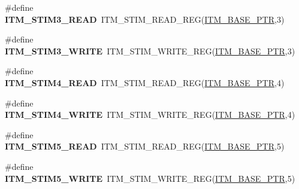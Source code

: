 \begin{DoxyCompactItemize}
\item 
\hypertarget{group___i_t_m___register___accessor___macros_gac2585aa635223db51bc5dfb64d5901f0}{}\#define {\bfseries I\+T\+M\+\_\+\+S\+T\+I\+M3\+\_\+\+R\+E\+A\+D}~I\+T\+M\+\_\+\+S\+T\+I\+M\+\_\+\+R\+E\+A\+D\+\_\+\+R\+E\+G(\hyperlink{group___i_t_m___peripheral_gafaddee8fe8b6a898d4e5edc43ee0d703}{I\+T\+M\+\_\+\+B\+A\+S\+E\+\_\+\+P\+T\+R},3)\label{group___i_t_m___register___accessor___macros_gac2585aa635223db51bc5dfb64d5901f0}

\item 
\hypertarget{group___i_t_m___register___accessor___macros_ga5dd9fe046bf774394e98b8aae32f09be}{}\#define {\bfseries I\+T\+M\+\_\+\+S\+T\+I\+M3\+\_\+\+W\+R\+I\+T\+E}~I\+T\+M\+\_\+\+S\+T\+I\+M\+\_\+\+W\+R\+I\+T\+E\+\_\+\+R\+E\+G(\hyperlink{group___i_t_m___peripheral_gafaddee8fe8b6a898d4e5edc43ee0d703}{I\+T\+M\+\_\+\+B\+A\+S\+E\+\_\+\+P\+T\+R},3)\label{group___i_t_m___register___accessor___macros_ga5dd9fe046bf774394e98b8aae32f09be}

\item 
\hypertarget{group___i_t_m___register___accessor___macros_ga7bc9ebee3625b9f578807478ac2a35fc}{}\#define {\bfseries I\+T\+M\+\_\+\+S\+T\+I\+M4\+\_\+\+R\+E\+A\+D}~I\+T\+M\+\_\+\+S\+T\+I\+M\+\_\+\+R\+E\+A\+D\+\_\+\+R\+E\+G(\hyperlink{group___i_t_m___peripheral_gafaddee8fe8b6a898d4e5edc43ee0d703}{I\+T\+M\+\_\+\+B\+A\+S\+E\+\_\+\+P\+T\+R},4)\label{group___i_t_m___register___accessor___macros_ga7bc9ebee3625b9f578807478ac2a35fc}

\item 
\hypertarget{group___i_t_m___register___accessor___macros_ga15f21956568cb77bc35327f9f4742b0f}{}\#define {\bfseries I\+T\+M\+\_\+\+S\+T\+I\+M4\+\_\+\+W\+R\+I\+T\+E}~I\+T\+M\+\_\+\+S\+T\+I\+M\+\_\+\+W\+R\+I\+T\+E\+\_\+\+R\+E\+G(\hyperlink{group___i_t_m___peripheral_gafaddee8fe8b6a898d4e5edc43ee0d703}{I\+T\+M\+\_\+\+B\+A\+S\+E\+\_\+\+P\+T\+R},4)\label{group___i_t_m___register___accessor___macros_ga15f21956568cb77bc35327f9f4742b0f}

\item 
\hypertarget{group___i_t_m___register___accessor___macros_ga71729386b6675413e54bbae85ca5f6b4}{}\#define {\bfseries I\+T\+M\+\_\+\+S\+T\+I\+M5\+\_\+\+R\+E\+A\+D}~I\+T\+M\+\_\+\+S\+T\+I\+M\+\_\+\+R\+E\+A\+D\+\_\+\+R\+E\+G(\hyperlink{group___i_t_m___peripheral_gafaddee8fe8b6a898d4e5edc43ee0d703}{I\+T\+M\+\_\+\+B\+A\+S\+E\+\_\+\+P\+T\+R},5)\label{group___i_t_m___register___accessor___macros_ga71729386b6675413e54bbae85ca5f6b4}

\item 
\hypertarget{group___i_t_m___register___accessor___macros_ga07b231bcf27e2a69fe3168aa387fc4b7}{}\#define {\bfseries I\+T\+M\+\_\+\+S\+T\+I\+M5\+\_\+\+W\+R\+I\+T\+E}~I\+T\+M\+\_\+\+S\+T\+I\+M\+\_\+\+W\+R\+I\+T\+E\+\_\+\+R\+E\+G(\hyperlink{group___i_t_m___peripheral_gafaddee8fe8b6a898d4e5edc43ee0d703}{I\+T\+M\+\_\+\+B\+A\+S\+E\+\_\+\+P\+T\+R},5)\label{group___i_t_m___register___accessor___macros_ga07b231bcf27e2a69fe3168aa387fc4b7}


\end{DoxyCompactItemize}
